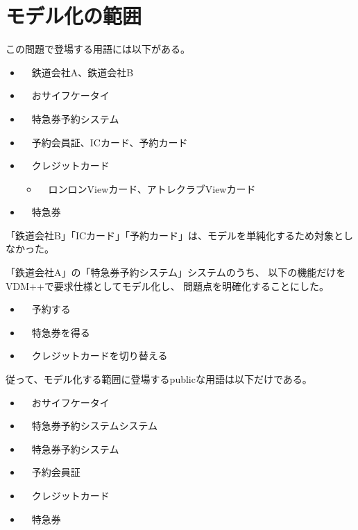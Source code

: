 \section {モデル化の範囲}
この問題で登場する用語には以下がある。

\begin{itemize}
\item　鉄道会社A、鉄道会社B
\item　おサイフケータイ
\item　特急券予約システム
\item　予約会員証、ICカード、予約カード
\item　クレジットカード
	\begin{itemize}
	\item　ロンロンViewカード、アトレクラブViewカード
	\end{itemize} 
\item　特急券
\end{itemize} 

「鉄道会社B」「ICカード」「予約カード」は、モデルを単純化するため対象としなかった。

「鉄道会社A」の「特急券予約システム」システムのうち、
以下の機能だけをVDM++\cite{SCSK2012PP}で要求仕様としてモデル化し、
問題点を明確化することにした。

\begin{itemize}
\item　予約する
\item　特急券を得る
\item　クレジットカードを切り替える
\end{itemize} 

従って、モデル化する範囲に登場するpublicな用語は以下だけである。
\begin{itemize}
\item　おサイフケータイ
\item　特急券予約システムシステム
\item　特急券予約システム
\item　予約会員証
\item　クレジットカード
\item　特急券
\end{itemize} 





